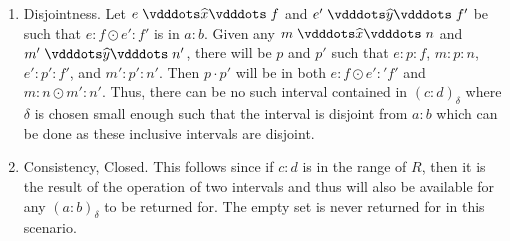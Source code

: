 \documentclass[12pt]{article}
\begin{document}
\begin{enumerate}
    
    \item Disjointness. Let $e \xora f$ and $e' \xora[y] f'$ be such that $e:f \odot e':f'$ is in $a:b$. Given any $m \xora n$ and $m' \xora[y] n'$, there will be $p$ and $p'$ such that $e:p:f$, $m:p:n$, $e':p':f'$, and $m':p':n'$. Then $p \cdot p'$ will be in both $e:f \odot e':'f'$ and $m:n \odot m':n'$. Thus, there can be no such interval contained in $(c:d)_\delta$ where $\delta$ is chosen small enough such that the interval is disjoint from $a:b$ which can be done as these inclusive intervals are disjoint. 
    \item Consistency, Closed. This follows since if $c:d$ is in the range of $R$, then it is the result of the operation of two intervals and thus will also be available for any $(a:b)_\delta$ to be returned for. The empty set is never returned for in this scenario. 
\end{enumerate}
\end{document}
